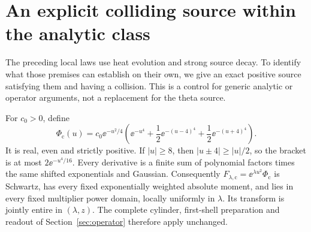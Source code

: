 \section{An explicit colliding source within the analytic class}
\label{sec:control}

The preceding local laws use heat evolution and strong source decay.
To identify what those premises can establish on their own, we give
an exact positive source satisfying them and having a collision.
This is a control for generic analytic or operator arguments, not a
replacement for the theta source.

For \(c_0>0\), define
\begin{equation}\label{eq:control-source}
 \Phi_{\mathrm c}(u)=c_0\ee^{-u^2/4}
 \left(\ee^{-u^4}+\frac12\ee^{-(u-4)^4}
                    +\frac12\ee^{-(u+4)^4}\right).
\end{equation}
It is real, even and strictly positive. If \(|u|\geq8\), then
\(|u\pm4|\geq|u|/2\), so the bracket is at most
\(2\ee^{-u^4/16}\). Every derivative is a finite sum of polynomial
factors times the same shifted exponentials and Gaussian.
Consequently \(F_{\lambda,\mathrm c}=\ee^{\lambda u^2}\Phi_{\mathrm c}\)
is Schwartz, has every fixed exponentially weighted absolute moment,
and lies in every fixed multiplier power domain, locally uniformly
in \(\lambda\). Its transform is jointly entire in \((\lambda,z)\).
The complete cylinder, first-shell preparation and readout of
Section~\ref{sec:operator} therefore apply unchanged.


